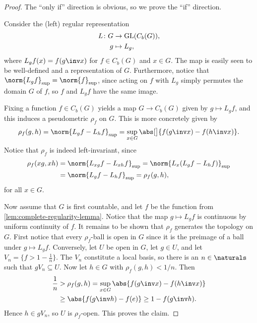 \documentclass[article, a4paper, 11pt, oneside]{memoir}
\numberwithin{equation}{chapter}
\begin{document}
\begin{proof}
    The \enquote{only if} direction is obvious, so we prove the \enquote{if} direction.

    Consider the (left) regular representation
    \begin{align*}
        L \colon G &\to \mathrm{GL}(C_b(G)), \\
        g &\mapsto L_g,
    \end{align*}
    where $L_g f(x) = f(g\inv x)$ for $f \in C_b(G)$ and $x \in G$. The map is easily seen to be well-defined and a representation of $G$. Furthermore, notice that $\norm{L_g f}_{\sup} = \norm{f}_{\sup}$, since acting on $f$ with $L_g$ simply permutes the domain $G$ of $f$, so $f$ and $L_g f$ have the same image.
    
    Fixing a function $f \in C_b(G)$ yields a map $G \to C_b(G)$ given by $g \mapsto L_g f$, and this induces a pseudometric $\rho_f$ on $G$. This is more concretely given by
    \begin{equation*}
        \rho_f(g,h)
            = \norm{L_g f - L_h f}_{\sup}
            = \sup_{x \in G} \abs[\big]{f(g\inv x) - f(h\inv x)}.
    \end{equation*}
    Notice that $\rho_f$ is indeed left-invariant, since
    \begin{align*}
        \rho_f(xg,xh)
            &= \norm{L_{xg} f - L_{xh} f}_{\sup}
             = \norm{L_x(L_g f - L_h f)}_{\sup} \\
            &= \norm{L_g f - L_h f}_{\sup}
             = \rho_f(g,h),
    \end{align*}
    for all $x \in G$.

    Now assume that $G$ is first countable, and let $f$ be the function from \cref{lem:complete-regularity-lemma}. Notice that the map $g \mapsto L_g f$ is continuous by uniform continuity of $f$. It remains to be shown that $\rho_f$ generates the topology on $G$. First notice that every $\rho_f$-ball is open in $G$ since it is the preimage of a ball under $g \mapsto L_g f$. Conversely, let $U$ be open in $G$, let $g \in U$, and let $V_n = \{f > 1 - \tfrac{1}{n}\}$. The $V_n$ constitute a local basis, so there is an $n \in \naturals$ such that $g V_n \subseteq U$. Now let $h \in G$ with $\rho_f(g,h) < 1/n$. Then
    \begin{align*}
        \frac{1}{n}
            &> \rho_f(g,h)
             = \sup_{x \in G} \abs{f(g\inv x) - f(h\inv x)} \\
            &\geq \abs{f(g\inv h) - f(e)}
             \geq 1 - f(g\inv h).
    \end{align*}
    Hence $h \in gV_n$, so $U$ is $\rho_f$-open. This proves the claim.
\end{proof}
\end{document}
